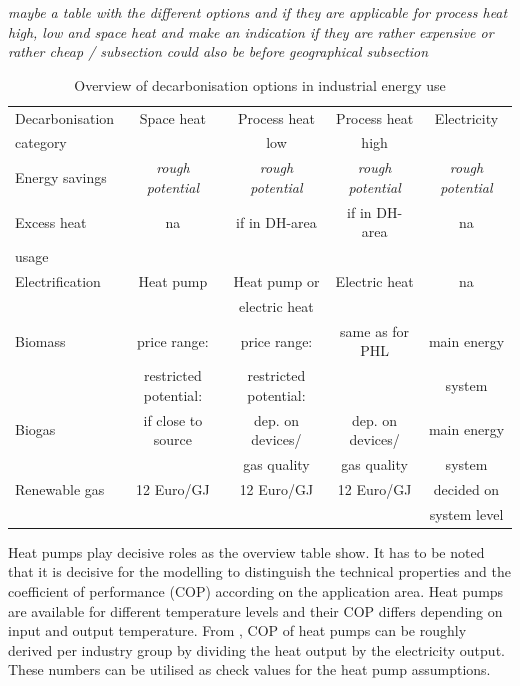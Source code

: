 \documentclass[review]{elsarticle}
\begin{document}
\textit{maybe a table with the different options and if they are applicable for process heat high, low and space heat and make an indication if they are rather expensive or rather cheap / subsection could also be before geographical subsection}
\begin{table}
\small{
\begin{tabular}{l | c | c | c | c}
Decarbonisation & Space heat & Process heat & Process heat & Electricity \\
category & & low & high & \\
\hline \hline
Energy savings & \textit{rough potential} & \textit{rough potential} & \textit{rough potential} & \textit{rough potential}\\

Excess heat & na & if in DH-area & if in DH-area & na\\
usage &&&&\\
Electrification & Heat pump & Heat pump or & Electric heat & na\\
&& electric heat &&\\
Biomass & price range: & price range: & same as for PHL & main energy\\
& restricted potential: & restricted potential: && system\\
Biogas & if close to source & dep. on devices/ & dep. on devices/ & main energy\\
&& gas quality & gas quality & system\\
Renewable gas &  12 Euro/GJ  & 12 Euro/GJ & 12 Euro/GJ & decided on\\
& \cite{EA2017,Jensen2017b,Bramstoft2017} &&& system level\\
\end{tabular}
\caption{Overview of decarbonisation options in industrial energy use}
\label{temperature_level} 
}
\end{table}

Heat pumps play decisive roles as the overview table show. It has to be noted that it is decisive for the modelling to distinguish the technical properties and the coefficient of performance (COP) according on the application area. Heat pumps are available for different temperature levels and their COP differs depending on input and output temperature. From \cite{VM2015}, COP of heat pumps can be roughly derived per industry group by dividing the heat output by the electricity output. These numbers can be utilised as check values for the heat pump assumptions.
\end{document}
